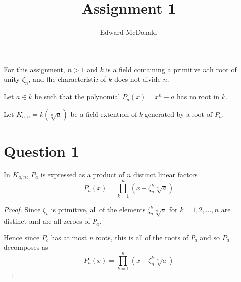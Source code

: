 \documentclass{unswmaths}
\begin{document}
\subject{Galois Theory}
\author{Edward McDonald}
\title{Assignment 1}


\setlength\parindent{0pt}


\unswtitle{}

    For this assignment, $n > 1$ and $k$ is a field
    containing a primitive $n$th root of unity $\zeta_n$,
    and the characteristic of $k$ does not divide $n$.
    
    Let $a \in k$ be such that the polynomial
    $P_a(x) = x^n-a$ has no root in $k$.
    
    Let $K_{a,n} = k(\!\sqrt[n]{a})$ be a field extention
    of $k$ generated by a root of $P_a$.

\section*{Question 1}
\begin{lemma}
    In $K_{a,n}$, $P_a$ is expressed as a product of $n$ distinct linear
    factors 
    \begin{equation*}
        P_a(x) = \prod_{k=1}^n (x-\zeta_n^k\sqrt[n]{a})
    \end{equation*}
\end{lemma}
\begin{proof}
    Since $\zeta_n$ is primitive, all
    of the elements $\zeta_n^k\sqrt[n]{a}$ for $k = 1,2,\ldots,n$
    are distinct and are all zeroes of $P_a$.
    
    Hence since $P_a$ has at most $n$ roots, this is all of the roots
    of $P_a$ and so $P_a$ decomposes as
    \begin{equation*}
        P_a(x) = \prod_{k=1}^n (x-\zeta_n^k\sqrt[n]{a})
    \end{equation*}
\end{proof}
\end{document}
